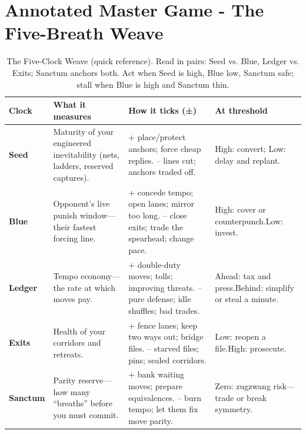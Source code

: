 \section*{Annotated Master Game - The Five-Breath Weave}

\begin{table}[h]
\centering
\renewcommand{\arraystretch}{1.1}
\begin{tabular}{p{2.6cm} p{5.2cm} p{5.0cm} p{3.2cm}}
\hline
\textbf{Clock} & \textbf{What it measures} & \textbf{How it ticks (±)} & \textbf{At threshold} \\
\hline
\textbf{Seed} &
Maturity of your engineered inevitability (nets, ladders, reserved captures). &
{+ place/protect anchors; force cheap replies.\newline
-- lines cut; anchors traded off.} &
High: convert; Low: delay and replant. \\
\hline
\textbf{Blue} &
Opponent's live punish window---their fastest forcing line. &
{+ concede tempo; open lanes; mirror too long.\newline
-- close exits; trade the spearhead; change pace.} &
High: cover or counterpunch.\newline Low: invest. \\
\hline
\textbf{Ledger} &
Tempo economy---the rate at which moves pay. &
{+ double-duty moves; tolls; improving threats.\newline
-- pure defense; idle shuffles; bad trades.} &
Ahead: tax and press.\newline Behind: simplify or steal a minute. \\
\hline
\textbf{Exits} &
Health of your corridors and retreats. &
{+ fence lanes; keep two ways out; bridge files.\newline
-- starved files; pins; sealed corridors.} &
Low: reopen a file.\newline High: prosecute. \\
\hline
\textbf{Sanctum} &
Parity reserve---how many ``breaths'' before you must commit. &
{+ bank waiting moves; prepare equivalences.\newline
-- burn tempo; let them fix move parity.} &
Zero: zugzwang risk---trade or break symmetry. \\
\hline
\end{tabular}
\caption{The Five-Clock Weave (quick reference). Read in pairs: Seed vs. Blue, Ledger vs. Exits; Sanctum anchors both. Act when Seed is high, Blue low, Sanctum safe; stall when Blue is high and Sanctum thin.}
\end{table}


